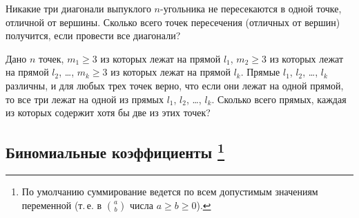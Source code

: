 \begin{problems}
\item
Никакие три диагонали выпуклого $n$-угольника не пересекаются в одной точке,
отличной от вершины.
Сколько всего точек пересечения (отличных от вершин) получится, если провести
все диагонали?

\item
Дано $n$ точек,
$m_1 \geq 3$ из которых лежат на прямой $l_1$,
$m_2 \geq 3$ из которых лежат на прямой $l_2$,
\ldots,
$m_k \geq 3$ из которых лежат на прямой $l_k$.
Прямые $l_1$, $l_2$, \ldots, $l_k$ различны, и для любых трех точек верно, что
если они лежат на одной прямой, то все три лежат на одной из прямых
$l_1$, $l_2$, \ldots, $l_k$.
Сколько всего прямых, каждая из которых содержит хотя бы две из этих точек?

\end{problems}

\subsection*{Биномиальные коэффициенты%
\footnote{По умолчанию суммирование ведется по всем допустимым значениям
переменной
(т.\,е. в ${\binom{a}{b}}$ числа $a \geq b \geq 0$).}}

\newcommand{\ds}{\displaystyle}

